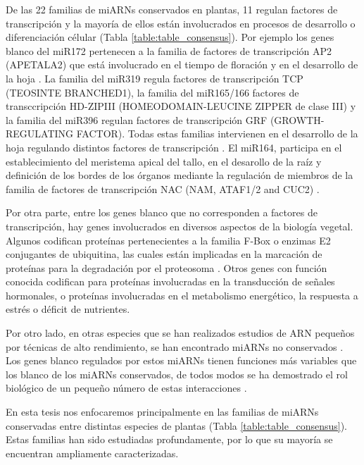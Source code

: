 De las 22 familias de miARNs conservados en plantas, 11 regulan factores de transcripción y la mayoría de ellos están involucrados en procesos de desarrollo o diferenciación célular \citep{Jones-Rhoades2006} (Tabla \ref{table:table_consensus}).
Por ejemplo los genes blanco del miR172 pertenecen a la familia de factores de transcripción AP2 (APETALA2) que está involucrado en el tiempo de floración y en el desarrollo de la hoja \citep{pmid14555699, pmid12893888}.
La familia del miR319 regula factores de transcripción TCP (TEOSINTE BRANCHED1), la familia del miR165/166 factores de transccripción HD-ZIPIII (HOMEODOMAIN-LEUCINE ZIPPER de clase III) y la familia del miR396 regulan factores de transcripción GRF (GROWTH-REGULATING FACTOR).
Todas estas familias intervienen en el desarrollo de la hoja regulando distintos factores de transcripción \citep{pmid12931144, pmid15351964, Rodriguez2010}.
El miR164, participa en el establecimiento del meristema apical del tallo, en el desarollo de la raíz y definición de los bordes de los órganos mediante la regulación de miembros de la familia de factores de transcripción NAC (NAM, ATAF1/2 and CUC2) \citep{laufus}.

Por otra parte, entre los genes blanco que no corresponden a factores de transcripción, hay genes involucrados en diversos aspectos de la biología vegetal.
Algunos codifican proteínas pertenecientes a la familia F-Box o enzimas E2 conjugantes de ubiquitina, las cuales están implicadas en la marcación de proteínas para la degradación por el proteosoma \citep{pmid19699140}.
Otros genes con función conocida codifican para proteínas involucradas en la transducción de señales hormonales, o proteínas involucradas en el metabolismo energético, la respuesta a estrés o déficit de nutrientes.

Por otro lado, en otras especies que se han realizados estudios de ARN pequeños por técnicas de alto rendimiento, se han encontrado miARNs no conservados \citep{citeulike:8816489, Rodriguez2010, Rajagopalan2006}.
Los genes blanco regulados por estos miARNs tienen funciones más variables que los blanco de los miARNs conservados, de todos modos se ha demostrado el rol biológico de un pequeño número de estas interacciones \citep{citeulike:8816489}.

En esta tesis nos enfocaremos principalmente en las familias de miARNs conservadas entre distintas especies de plantas (Tabla \ref{table:table_consensus}).
Estas familias han sido estudiadas profundamente, por lo que su mayoría se encuentran ampliamente caracterizadas.



